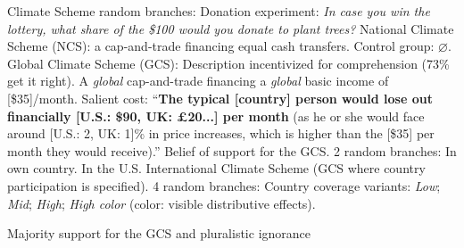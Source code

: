 \documentclass[aspectratio=169,xcolor=dvipsnames, 11pt,mathserif]{beamer}
\begin{document}
\begin{frame}{Climate Scheme\label{cs}} 
    \bbvsp {} random branches:
      \bbvsp \ip Donation experiment: \textit{In case you win the lottery, what share of the \$100 would you donate to plant trees?}
      \ip National Climate Scheme (NCS): a cap-and-trade financing equal cash transfers.
      \ip Control group: $\varnothing$. \ee
    \ip Global Climate Scheme (GCS): \hyperlink{gcs_question}{} 
      \bbvsp \ip Description incentivized for comprehension (73\% get it right).
      \ip A \textit{global} cap-and-trade financing a \textit{global} basic income of [\$35]/month.
      \ip Salient cost: ``\textbf{The typical [country] person would lose out financially [U.S.: \$90, UK: £20...] per month} (as he or she would face around [U.S.: 2, UK: 1]\% in price increases, which is higher than the [\$35] per month they would receive).'' \ee
    \ip Belief of support for the GCS. 2 random branches:
      \bbvs \ip In own country.
      \ip In the U.S. \ee
    \ip International Climate Scheme (GCS where country participation is specified). 4 random branches:
    \bbvs \ip  Country coverage variants: \textit{Low}; \textit{Mid}; \textit{High}; \textit{High color} (color: visible distributive effects). \ee
    \ee
\end{frame}

\begin{frame}{Majority support for the GCS and pluralistic ignorance}
\end{frame}
\end{document}
